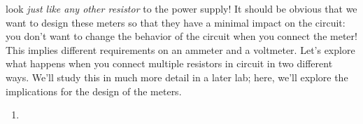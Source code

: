 \documentclass[12pt]{article}
\begin{document}
\begin{enumerate}
  look \textit{just like any other resistor} to the power supply!  It
  should be obvious that we want to design these meters so that they
  have a minimal impact on the circuit: you don't want to change the
  behavior of the circuit when you connect the meter!  This implies
  different requirements on an ammeter and a voltmeter.  Let's explore
  what happens when you connect multiple resistors in circuit in two
  different ways.  We'll study this in much more detail in a later
  lab; here, we'll explore the implications for the design of the
  meters. 
  \begin{enumerate}
  \item \label{item:identical}
    \begin{figure}
      \centering
      \qquad {}
\end{figure}
\end{enumerate}
\end{enumerate}
\end{document}
